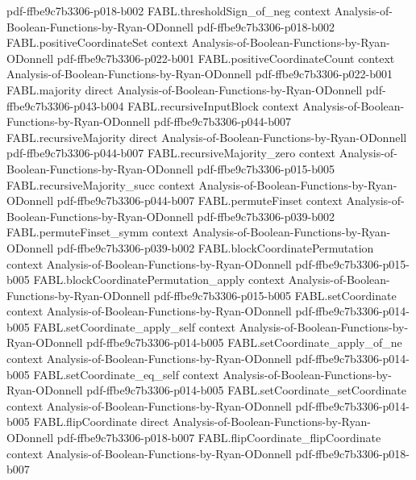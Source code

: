 \begin{theorem}
  {pdf-ffbe9c7b3306-p018-b002}
\proofstep
  {FABL.thresholdSign_of_neg}
  {context}
  {Analysis-of-Boolean-Functions-by-Ryan-ODonnell}
  {pdf-ffbe9c7b3306-p018-b002}
\proofstep
  {FABL.positiveCoordinateSet}
  {context}
  {Analysis-of-Boolean-Functions-by-Ryan-ODonnell}
  {pdf-ffbe9c7b3306-p022-b001}
\proofstep
  {FABL.positiveCoordinateCount}
  {context}
  {Analysis-of-Boolean-Functions-by-Ryan-ODonnell}
  {pdf-ffbe9c7b3306-p022-b001}
\proofstep
  {FABL.majority}
  {direct}
  {Analysis-of-Boolean-Functions-by-Ryan-ODonnell}
  {pdf-ffbe9c7b3306-p043-b004}
\proofstep
  {FABL.recursiveInputBlock}
  {context}
  {Analysis-of-Boolean-Functions-by-Ryan-ODonnell}
  {pdf-ffbe9c7b3306-p044-b007}
\proofstep
  {FABL.recursiveMajority}
  {direct}
  {Analysis-of-Boolean-Functions-by-Ryan-ODonnell}
  {pdf-ffbe9c7b3306-p044-b007}
\proofstep
  {FABL.recursiveMajority_zero}
  {context}
  {Analysis-of-Boolean-Functions-by-Ryan-ODonnell}
  {pdf-ffbe9c7b3306-p015-b005}
\proofstep
  {FABL.recursiveMajority_succ}
  {context}
  {Analysis-of-Boolean-Functions-by-Ryan-ODonnell}
  {pdf-ffbe9c7b3306-p044-b007}
\proofstep
  {FABL.permuteFinset}
  {context}
  {Analysis-of-Boolean-Functions-by-Ryan-ODonnell}
  {pdf-ffbe9c7b3306-p039-b002}
\proofstep
  {FABL.permuteFinset_symm}
  {context}
  {Analysis-of-Boolean-Functions-by-Ryan-ODonnell}
  {pdf-ffbe9c7b3306-p039-b002}
\proofstep
  {FABL.blockCoordinatePermutation}
  {context}
  {Analysis-of-Boolean-Functions-by-Ryan-ODonnell}
  {pdf-ffbe9c7b3306-p015-b005}
\proofstep
  {FABL.blockCoordinatePermutation_apply}
  {context}
  {Analysis-of-Boolean-Functions-by-Ryan-ODonnell}
  {pdf-ffbe9c7b3306-p015-b005}
\proofstep
  {FABL.setCoordinate}
  {context}
  {Analysis-of-Boolean-Functions-by-Ryan-ODonnell}
  {pdf-ffbe9c7b3306-p014-b005}
\proofstep
  {FABL.setCoordinate_apply_self}
  {context}
  {Analysis-of-Boolean-Functions-by-Ryan-ODonnell}
  {pdf-ffbe9c7b3306-p014-b005}
\proofstep
  {FABL.setCoordinate_apply_of_ne}
  {context}
  {Analysis-of-Boolean-Functions-by-Ryan-ODonnell}
  {pdf-ffbe9c7b3306-p014-b005}
\proofstep
  {FABL.setCoordinate_eq_self}
  {context}
  {Analysis-of-Boolean-Functions-by-Ryan-ODonnell}
  {pdf-ffbe9c7b3306-p014-b005}
\proofstep
  {FABL.setCoordinate_setCoordinate}
  {context}
  {Analysis-of-Boolean-Functions-by-Ryan-ODonnell}
  {pdf-ffbe9c7b3306-p014-b005}
\proofstep
  {FABL.flipCoordinate}
  {direct}
  {Analysis-of-Boolean-Functions-by-Ryan-ODonnell}
  {pdf-ffbe9c7b3306-p018-b007}
\proofstep
  {FABL.flipCoordinate_flipCoordinate}
  {context}
  {Analysis-of-Boolean-Functions-by-Ryan-ODonnell}
  {pdf-ffbe9c7b3306-p018-b007}

\end{theorem}
